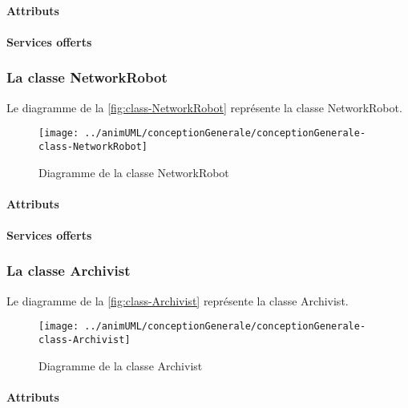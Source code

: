 \paragraph{Attributs}
\classNetworkPhoneProperties
\paragraph{Services offerts}
\classNetworkPhoneOperations
\subsubsection{La classe NetworkRobot}

Le diagramme de la \autoref{fig:class-NetworkRobot} représente la classe NetworkRobot.
\begin{figure}[H]
	\centering
	\texttt{[image: ../animUML/conceptionGenerale/conceptionGenerale-class-NetworkRobot]}
	\caption{Diagramme de la classe NetworkRobot}
	\label{fig:class-NetworkRobot}
\end{figure}


\paragraph{Attributs}
\classNetworkRobotProperties
\paragraph{Services offerts}
\classNetworkRobotOperations
\subsubsection{La classe Archivist}

Le diagramme de la \autoref{fig:class-Archivist} représente la classe Archivist.
\begin{figure}[H]
	\centering
	\texttt{[image: ../animUML/conceptionGenerale/conceptionGenerale-class-Archivist]}
	\caption{Diagramme de la classe Archivist}
	\label{fig:class-Archivist}
\end{figure}


\paragraph{Attributs}
\classArchivistProperties
